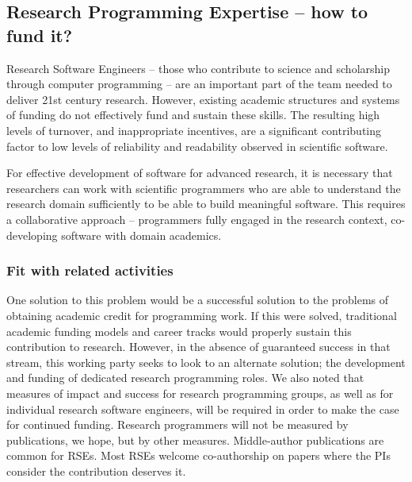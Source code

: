 \subsection{Research Programming Expertise -- how to fund it?}
\label{RSE}



Research Software Engineers -- those who contribute to science and scholarship
through computer programming -- are an important part of the team
needed to deliver 21st century research. However, existing academic structures
and systems of funding do not effectively fund and sustain these skills.
The resulting high levels of turnover, and inappropriate incentives,
are a significant contributing factor to low levels of reliability and
readability observed in scientific software.

For effective development of software for advanced research, it is necessary
that researchers can work with scientific programmers who are able to understand
the research domain sufficiently to be able to build meaningful software. This
requires a collaborative approach -- programmers fully engaged in the research
context, co-developing software with domain academics.

\subsubsection{Fit with related activities}

One solution to this problem would be a successful solution to the problems of
obtaining academic credit for programming work. If this were solved, traditional
academic funding models and career tracks would properly sustain this
contribution to research. However, in the absence of guaranteed success in that
stream, this working party seeks to look to an alternate solution; the
development and funding of dedicated research programming roles. We also noted
that measures of impact and success for research programming
groups, as well as for individual research software engineers, will be required
in order to make the case for continued funding. Research programmers will not
be measured by publications, we hope, but by other measures. Middle-author
publications are common for RSEs. Most RSEs welcome co-authorship on papers
where the PIs consider the contribution deserves it.


